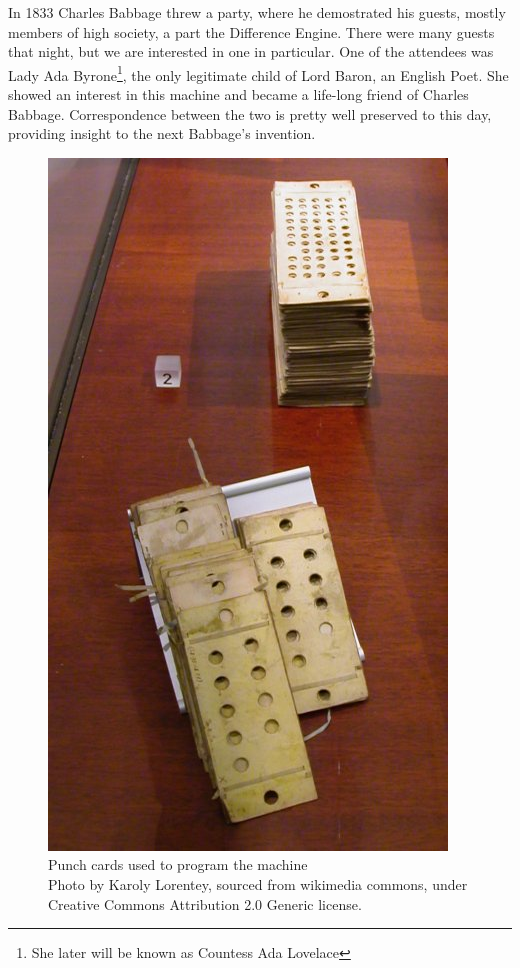 \documentclass{report}
\begin{document}
            In 1833 Charles Babbage threw a party, where he demostrated his guests, mostly members of high society, a part the Difference Engine. There were many
            guests that night, but we are interested in one in particular. One of the attendees was Lady Ada Byrone\footnote{She later will be known as Countess Ada Lovelace},
            the only legitimate child of Lord Baron, an English Poet. She showed an interest in this machine and became a life-long friend of Charles Babbage.
            Correspondence between the two is pretty well preserved to this day, providing insight to the next Babbage's invention. \par

            \begin{figure}
                \centering
                \includegraphics[scale=0.8]{images/misc/analytical_engine_punch_cards.jpg}
                \caption{Punch cards used to program the machine\\\tiny{Photo by Karoly Lorentey, sourced from wikimedia commons, under  Creative Commons Attribution 2.0 Generic license.}}
            \end{figure}
\end{document}
